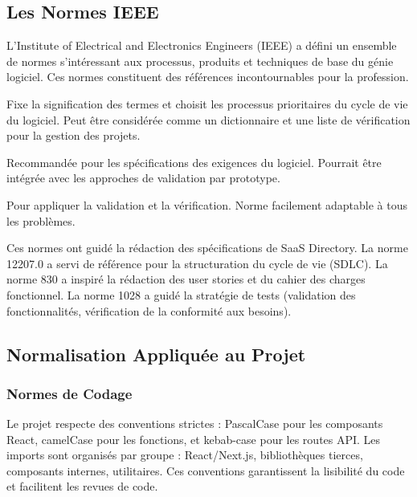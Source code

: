 \subsection{Les Normes IEEE}

L'Institute of Electrical and Electronics Engineers (IEEE) a défini un ensemble de normes s'intéressant aux processus, produits et techniques de base du génie logiciel. Ces normes constituent des références incontournables pour la profession.

\begin{definitionbox}[title={IEEE Std 12207.0}]
Fixe la signification des termes et choisit les processus prioritaires du cycle de vie du logiciel. Peut être considérée comme un dictionnaire et une liste de vérification pour la gestion des projets.
\end{definitionbox}

\begin{definitionbox}[title={IEEE Std 830}]
Recommandée pour les spécifications des exigences du logiciel. Pourrait être intégrée avec les approches de validation par prototype.
\end{definitionbox}

\begin{definitionbox}[title={IEEE Std 1028}]
Pour appliquer la validation et la vérification. Norme facilement adaptable à tous les problèmes.
\end{definitionbox}

Ces normes ont guidé la rédaction des spécifications de SaaS Directory. La norme 12207.0 a servi de référence pour la structuration du cycle de vie (SDLC). La norme 830 a inspiré la rédaction des user stories et du cahier des charges fonctionnel. La norme 1028 a guidé la stratégie de tests (validation des fonctionnalités, vérification de la conformité aux besoins).

\subsection{Normalisation Appliquée au Projet}

\subsubsection{Normes de Codage}

Le projet respecte des conventions strictes : PascalCase pour les composants React, camelCase pour les fonctions, et kebab-case pour les routes API. Les imports sont organisés par groupe : React/Next.js, bibliothèques tierces, composants internes, utilitaires. Ces conventions garantissent la lisibilité du code et facilitent les revues de code.

